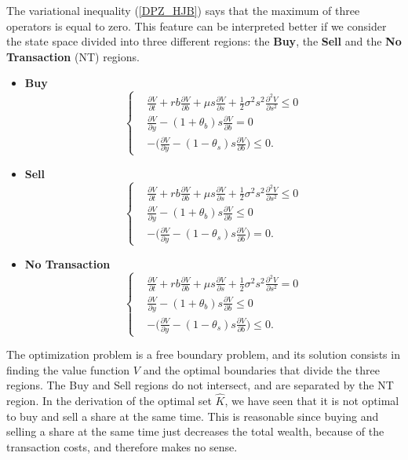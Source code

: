 \noindent
The variational inequality (\ref{DPZ_HJB}) says that the maximum of three operators is equal to zero.
This feature can be interpreted better if we consider the state space divided into three different regions: the \textbf{Buy}, the \textbf{Sell}
and the \textbf{No Transaction} (NT) regions.
\begin{itemize}
 \item \textbf{Buy}
  \begin{equation*}
   \begin{cases}
     & \frac{\partial V}{\partial t} + rb\frac{\partial V}{\partial b} + \mu s \frac{\partial V}{\partial s} + \frac{1}{2}\sigma^2 s^2 \frac{\partial^2 V}{\partial s^2} \leq 0\\ 
     & \frac{\partial V}{\partial y}-(1+\theta_b) s \frac{\partial V}{\partial b} = 0 \\
     & -\biggl(\frac{\partial V}{\partial y}-(1-\theta_s)s \frac{\partial V}{\partial b} \biggr) \leq 0.
   \end{cases}
  \end{equation*}
 \item \textbf{Sell}
  \begin{equation*}
   \begin{cases}
     & \frac{\partial V}{\partial t} + rb\frac{\partial V}{\partial b} + \mu s \frac{\partial V}{\partial s} + \frac{1}{2}\sigma^2 s^2 \frac{\partial^2 V}{\partial s^2} \leq 0 \\ 
     & \frac{\partial V}{\partial y}-(1+\theta_b) s \frac{\partial V}{\partial b} \leq 0 \\
     & -\biggl(\frac{\partial V}{\partial y}-(1-\theta_s)s \frac{\partial V}{\partial b} \biggr) = 0.
   \end{cases}
  \end{equation*}
 \item \textbf{No Transaction}
  \begin{equation*}
   \begin{cases}
     & \frac{\partial V}{\partial t} + rb\frac{\partial V}{\partial b} + \mu s \frac{\partial V}{\partial s} + \frac{1}{2}\sigma^2 s^2 \frac{\partial^2 V}{\partial s^2} = 0 \\ 
     & \frac{\partial V}{\partial y}-(1+\theta_b) s \frac{\partial V}{\partial b} \leq 0 \\
     & -\biggl(\frac{\partial V}{\partial y}-(1-\theta_s)s \frac{\partial V}{\partial b} \biggr) \leq 0.
   \end{cases}
  \end{equation*}
\end{itemize}
The optimization problem is a free boundary problem, and its solution consists in finding the value function $V$ and the 
optimal boundaries that divide the three regions.
The Buy and Sell regions do not intersect, and are separated by the NT region. 
In the derivation of the optimal set $\hat K$, we have seen that it is not optimal to buy and sell a share at the same time. 
This is reasonable since buying and selling a share at the same time just decreases the 
total wealth, because of the transaction costs, and therefore makes no sense. 

